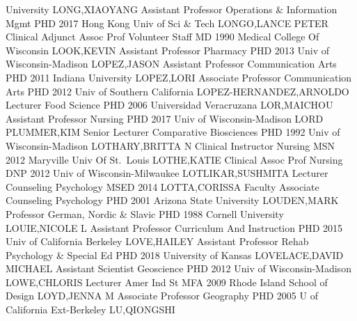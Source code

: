 \documentclass[
]{article}
\begin{document}
University \textbar LONG,XIAOYANG \textbar{} 
\textbar Assistant Professor \textbar Operations \& Information Mgmt
\textbar PHD 2017 Hong Kong Univ of Sci \& Tech \textbar LONGO,LANCE
PETER \textbar{}  \textbar Clinical Adjunct Assoc Prof
\textbar Volunteer Staff \textbar MD 1990 Medical College Of Wisconsin
\textbar LOOK,KEVIN \textbar{}  \textbar Assistant Professor
\textbar Pharmacy \textbar PHD 2013 Univ of Wisconsin-Madison
\textbar LOPEZ,JASON \textbar{}  \textbar Assistant
Professor \textbar Communication Arts \textbar PHD 2011 Indiana
University \textbar LOPEZ,LORI \textbar{} 
\textbar Associate Professor \textbar Communication Arts \textbar PHD
2012 Univ of Southern California \textbar LOPEZ-HERNANDEZ,ARNOLDO
\textbar{}  \textbar Lecturer \textbar Food Science
\textbar PHD 2006 Universidad Veracruzana \textbar LOR,MAICHOU
\textbar{}  \textbar Assistant Professor \textbar Nursing
\textbar PHD 2017 Univ of Wisconsin-Madison \textbar LORD PLUMMER,KIM
\textbar{}  \textbar Senior Lecturer \textbar Comparative
Biosciences \textbar PHD 1992 Univ of Wisconsin-Madison
\textbar LOTHARY,BRITTA N \textbar{}  \textbar Clinical
Instructor \textbar Nursing \textbar MSN 2012 Maryville Univ Of
St.~Louis \textbar LOTHE,KATIE \textbar{}  \textbar Clinical
Assoc Prof \textbar Nursing \textbar DNP 2012 Univ of
Wisconsin-Milwaukee \textbar LOTLIKAR,SUSHMITA \textbar{} 
\textbar Lecturer \textbar Counseling Psychology \textbar MSED 2014
\textbar LOTTA,CORISSA \textbar{}  \textbar Faculty
Associate \textbar Counseling Psychology \textbar PHD 2001 Arizona State
University \textbar LOUDEN,MARK \textbar{} 
\textbar Professor \textbar German, Nordic \& Slavic \textbar PHD 1988
Cornell University \textbar LOUIE,NICOLE L \textbar{} 
\textbar Assistant Professor \textbar Curriculum And Instruction
\textbar PHD 2015 Univ of California Berkeley \textbar LOVE,HAILEY
\textbar{}  \textbar Assistant Professor \textbar Rehab
Psychology \& Special Ed \textbar PHD 2018 University of Kansas
\textbar LOVELACE,DAVID MICHAEL \textbar{} 
\textbar Assistant Scientist \textbar Geoscience \textbar PHD 2012 Univ
of Wisconsin-Madison \textbar LOWE,CHLORIS \textbar{} 
\textbar Lecturer \textbar Amer Ind St \textbar MFA 2009 Rhode Island
School of Design \textbar LOYD,JENNA M \textbar{} 
\textbar Associate Professor \textbar Geography \textbar PHD 2005 U of
California Ext-Berkeley \textbar LU,QIONGSHI \textbar{} 
\end{document}
